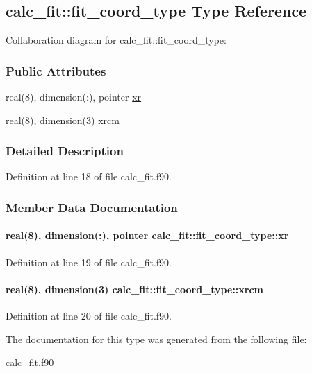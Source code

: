 \hypertarget{structcalc__fit_1_1fit__coord__type}{\subsection{calc\-\_\-fit\-:\-:fit\-\_\-coord\-\_\-type Type Reference}
\label{structcalc__fit_1_1fit__coord__type}
}


Collaboration diagram for calc\-\_\-fit\-:\-:fit\-\_\-coord\-\_\-type\-:
\subsubsection*{Public Attributes}
\begin{DoxyCompactItemize}
\item 
real(8), dimension(\-:), pointer \hyperlink{structcalc__fit_1_1fit__coord__type_a64e396f38857dba51d8676b0626b0e39}{xr}
\item 
real(8), dimension(3) \hyperlink{structcalc__fit_1_1fit__coord__type_a8f5930886e50e49d842dd416cc9e2d8f}{xrcm}
\end{DoxyCompactItemize}


\subsubsection{Detailed Description}


Definition at line 18 of file calc\-\_\-fit.\-f90.



\subsubsection{Member Data Documentation}
\hypertarget{structcalc__fit_1_1fit__coord__type_a64e396f38857dba51d8676b0626b0e39}{
\paragraph[{xr}]{\setlength{\rightskip}{0pt plus 5cm}real(8), dimension(\-:), pointer calc\-\_\-fit\-::fit\-\_\-coord\-\_\-type\-::xr}}\label{structcalc__fit_1_1fit__coord__type_a64e396f38857dba51d8676b0626b0e39}


Definition at line 19 of file calc\-\_\-fit.\-f90.

\hypertarget{structcalc__fit_1_1fit__coord__type_a8f5930886e50e49d842dd416cc9e2d8f}{
\paragraph[{xrcm}]{\setlength{\rightskip}{0pt plus 5cm}real(8), dimension(3) calc\-\_\-fit\-::fit\-\_\-coord\-\_\-type\-::xrcm}}\label{structcalc__fit_1_1fit__coord__type_a8f5930886e50e49d842dd416cc9e2d8f}


Definition at line 20 of file calc\-\_\-fit.\-f90.



The documentation for this type was generated from the following file\-:\begin{DoxyCompactItemize}
\item 
\hyperlink{calc__fit_8f90}{calc\-\_\-fit.\-f90}\end{DoxyCompactItemize}
